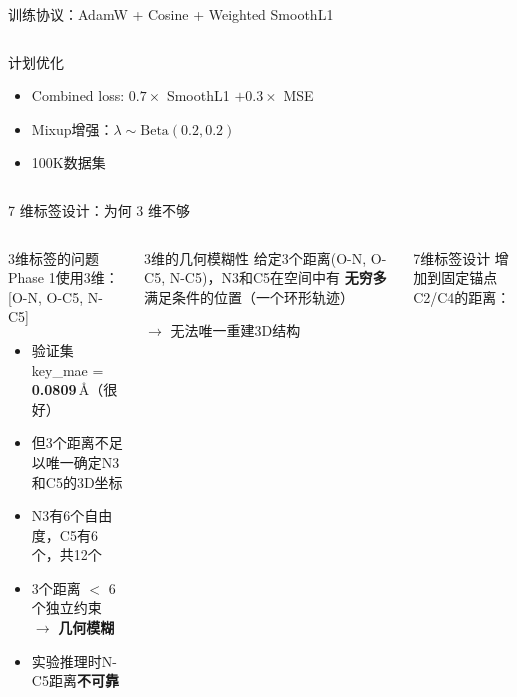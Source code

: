 \documentclass[aspectratio=169,9pt]{beamer}
\begin{document}
\begin{frame}{训练协议：AdamW + Cosine + Weighted SmoothL1}
\begin{columns}[T]
    \begin{exampleblock}{计划优化}
      \scriptsize
      \begin{itemize}
        \item Combined loss: $0.7 \times$ SmoothL1 $+ 0.3 \times$ MSE
        \item Mixup增强：$\lambda \sim \text{Beta}(0.2, 0.2)$
        \item 100K数据集
      \end{itemize}
    \end{exampleblock}
  \end{columns}
\end{frame}

\begin{frame}{7 维标签设计：为何 3 维不够}
  \begin{columns}[T]
    \begin{block}{3维标签的问题}
      \scriptsize
      Phase 1使用3维：[O-N, O-C5, N-C5]

      \begin{itemize}
        \item 验证集 key\_mae = \textbf{0.0809}\,\AA（很好）
        \item 但3个距离不足以唯一确定N3和C5的3D坐标
        \item N3有6个自由度，C5有6个，共12个
        \item 3个距离 $<$ 6个独立约束 $\to$ \textbf{几何模糊}
        \item 实验推理时N-C5距离\textbf{不可靠}
      \end{itemize}
    \end{block}

    \begin{alertblock}{3维的几何模糊性}
      \scriptsize
      给定3个距离(O-N, O-C5, N-C5)，N3和C5在空间中有
      \textbf{无穷多}满足条件的位置（一个环形轨迹）

      $\to$ 无法唯一重建3D结构
    \end{alertblock}

    \begin{block}{7维标签设计}
      \scriptsize
      增加到固定锚点C2/C4的距离：


\end{block}
\end{columns}
\end{frame}
\end{document}
